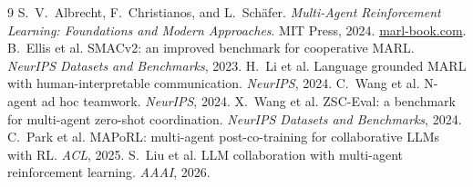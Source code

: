 \documentclass{article}
\begin{document}
\vspace{-8pt}
{\scriptsize
\begin{thebibliography}{9}\setlength{\itemsep}{0pt}\setlength{\parskip}{0pt}
 S.~V.~Albrecht, F.~Christianos, and L.~Sch\"afer. \emph{Multi-Agent Reinforcement Learning: Foundations and Modern Approaches}. MIT Press, 2024. \href{https://www.marl-book.com}{marl-book.com}.
 B.~Ellis et al. SMACv2: an improved benchmark for cooperative MARL. \emph{NeurIPS Datasets and Benchmarks}, 2023.
 H.~Li et al. Language grounded MARL with human-interpretable communication. \emph{NeurIPS}, 2024.
 C.~Wang et al. N-agent ad hoc teamwork. \emph{NeurIPS}, 2024.
 X.~Wang et al. ZSC-Eval: a benchmark for multi-agent zero-shot coordination. \emph{NeurIPS Datasets and Benchmarks}, 2024.
 C.~Park et al. MAPoRL: multi-agent post-co-training for collaborative LLMs with RL. \emph{ACL}, 2025.
 S.~Liu et al. LLM collaboration with multi-agent reinforcement learning. \emph{AAAI}, 2026.
\end{thebibliography}}

\vspace{2pt}
\begin{center}
\end{center}
\end{document}
